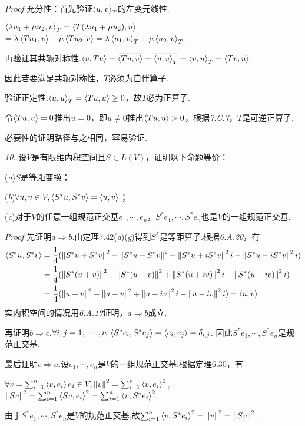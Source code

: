 \textit{Proof}
充分性：首先验证\(\ip{u}{v}_T\)的左变元线性.

\(\ip{\lambda u_1+\mu u_2}{v}_T=\ip{T(\lambda u_1+\mu u_2)}{u}\)
\(=\lambda \ip{Tu_1}{v}+\mu \ip{Tu_2}{v}=\lambda \ip{u_1}{v}_T+\mu \ip{u_2}{v}_T\).

再验证其共轭对称性.\(\ip{v}{Tu}=\ol{\ip{Tu}{v}}=\ol{\ip{u}{v}_T}=\ip{v}{u}_T=\ip{Tv}{u}\).

因此若要满足共轭对称性，\(T\)必须为自伴算子.

验证正定性.\(\ip{u}{u}_T=\ip{Tu}{u} \geq 0\)，故\(T\)必为正算子.

令\(\ip{Tu}{u}=0\)推出\(u=0\)，即\(u \ne 0\)推出\(\ip{Tu}{u}>0\)，根据\textit{7.C.7}，\(T\)是可逆正算子.

必要性的证明路径与之相同，容易验证.

\newpage

\textit{10.}
设\(V\)是有限维内积空间且\(S \in L(V)\)，证明以下命题等价：

(\textit{a})\(S\)是等距变换；

(\textit{b})\(\forall u,v \in V,\ip{S^*u}{S^*v}=\ip{u}{v}\)；

(\textit{c})对于\(V\)的任意一组规范正交基\(e_1,\cdots,e_n\)，\(S^*e_1,\cdots,S^*e_n\)也是\(V\)的一组规范正交基.

\textit{Proof}
先证明\(a \Rightarrow b\).由定理7.42(\textit{a})(\textit{g})得到\(S^*\)是等距算子.根据\textit{6.A.20}，有
    \begin{align*}
        \ip{S^*u}{S^*v}&=\dfrac{1}{4}(\norm{S^*u+S^*v}^2-\norm{S^*u-S^*v}^2+\norm{S^*u+iS^*v}^2i-\norm{S^*u-iS^*v}^2i) \\
        &=\dfrac{1}{4}(\norm{S^*(u+v)}^2-\norm{S^*(u-v)}^2+\norm{S^*(u+iv)}^2i-\norm{S^*(u-iv)}^2i) \\
        &=\dfrac{1}{4}(\norm{u+v}^2-\norm{u-v}^2+\norm{u+iv}^2i-\norm{u-iv}^2i)=\ip{u}{v}
    \end{align*}
实内积空间的情况用\textit{6.A.19}证明，\(a \Rightarrow b\)成立.

再证明\(b \Rightarrow c\).\(\forall i,j=1,\cdots,n,\ip{S^*e_i}{S^*e_j}=\ip{e_i}{e_j}=\delta_{i,j}\).
因此\(S^*e_1,\cdots,S^*e_n\)是规范正交基.

最后证明\(c \Rightarrow a\).设\(e_1,\cdots,e_n\)是\(V\)的一组规范正交基.根据定理6.30，有

\(\forall v=\sum_{i=1}^n \ip{v}{e_i}e_i \in V,\norm{v}^2=\sum_{i=1}^n \ip{v}{e_i}^2\),
\(\norm{Sv}^2=\sum_{i=1}^n \ip{Sv}{e_i}^2=\sum_{i=1}^n \ip{v}{S^*e_i}^2\).

由于\(S^*e_1,\cdots,S^*e_n\)是\(V\)的规范正交基,故\(\sum_{i=1}^n \ip{v}{S^*e_i}^2=\norm{v}^2=\norm{Sv}^2\).


